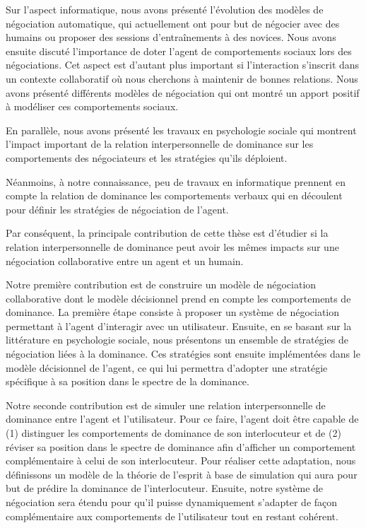 			Sur l'aspect informatique, nous avons présenté l'évolution des modèles de négociation automatique, qui actuellement ont pour but de négocier avec des humains ou proposer des sessions d'entraînements à des novices. 			 
			Nous avons ensuite discuté l'importance de doter l'agent de comportements sociaux lors des négociations. Cet aspect est d'autant plus important si l'interaction s'inscrit dans un contexte collaboratif où nous cherchons à maintenir de bonnes relations. Nous avons présenté différents modèles de négociation qui ont montré un apport positif à modéliser ces comportements sociaux. 
			
			En parallèle, nous avons présenté les travaux en psychologie sociale qui montrent l'impact important de la relation interpersonnelle de dominance sur les comportements des négociateurs et les stratégies qu'ils déploient.
			
			Néanmoins, à notre connaissance, peu de travaux en informatique prennent en compte la relation de dominance les comportements verbaux qui en découlent pour définir les stratégies de négociation de l'agent.
			
			Par conséquent, la principale contribution de cette thèse est d'étudier si la relation interpersonnelle de dominance peut avoir les mêmes impacts sur une négociation collaborative entre un agent et un humain.
			
			Notre première contribution est de construire un modèle de négociation collaborative dont le modèle décisionnel prend en compte les comportements de dominance. 
			La première étape consiste à proposer un système de négociation permettant à l'agent d'interagir avec un utilisateur. 
			Ensuite, en se basant sur la littérature en psychologie sociale, nous présentons un ensemble de stratégies de négociation liées à la dominance.
			Ces stratégies sont ensuite implémentées dans le modèle décisionnel de l'agent, ce qui lui permettra d'adopter une stratégie spécifique à sa position dans le spectre de la dominance.   
			
			Notre seconde contribution est de simuler une relation interpersonnelle de dominance entre l'agent et l'utilisateur. Pour ce faire, l'agent doit être capable de (1) distinguer les comportements de dominance de son interlocuteur et  de (2) réviser sa position dans le spectre de dominance afin  d'afficher un comportement complémentaire à celui de son interlocuteur. 
			Pour réaliser cette adaptation, nous définissons un modèle de la théorie de l'esprit à base de simulation qui aura pour but de prédire la dominance de l'interlocuteur. Ensuite, notre système de négociation sera étendu pour qu'il puisse dynamiquement s'adapter de façon complémentaire aux comportements de l'utilisateur tout en restant cohérent. 
		
		
	
	  